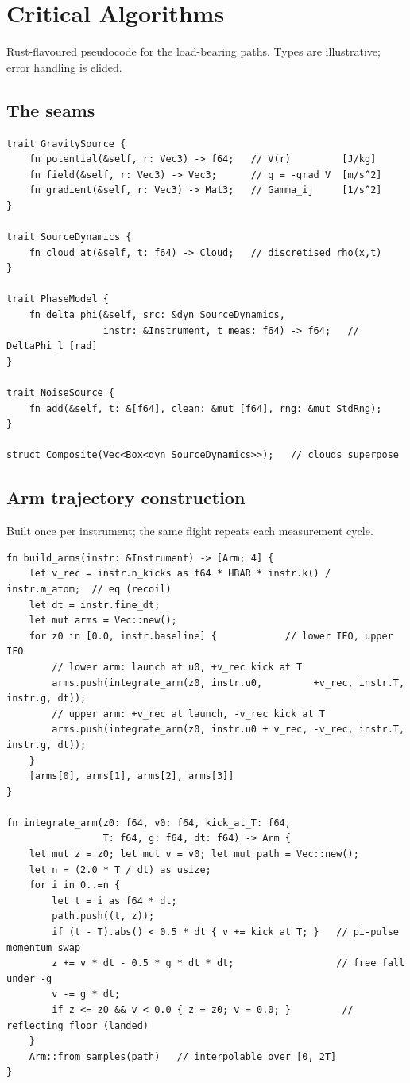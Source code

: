 \documentclass[11pt,a4paper]{article}
\theoremstyle{reqstyle}
\begin{document}
\section{Critical Algorithms}
\label{sec:algorithms}

Rust-flavoured pseudocode for the load-bearing paths. Types are illustrative; error
handling is elided.

\subsection{The seams}
\begin{lstlisting}
trait GravitySource {
    fn potential(&self, r: Vec3) -> f64;   // V(r)         [J/kg]
    fn field(&self, r: Vec3) -> Vec3;      // g = -grad V  [m/s^2]
    fn gradient(&self, r: Vec3) -> Mat3;   // Gamma_ij     [1/s^2]
}

trait SourceDynamics {
    fn cloud_at(&self, t: f64) -> Cloud;   // discretised rho(x,t)
}

trait PhaseModel {
    fn delta_phi(&self, src: &dyn SourceDynamics,
                 instr: &Instrument, t_meas: f64) -> f64;   // DeltaPhi_l [rad]
}

trait NoiseSource {
    fn add(&self, t: &[f64], clean: &mut [f64], rng: &mut StdRng);
}

struct Composite(Vec<Box<dyn SourceDynamics>>);   // clouds superpose
\end{lstlisting}

\subsection{Arm trajectory construction}
Built once per instrument; the same flight repeats each measurement cycle.
\begin{lstlisting}
fn build_arms(instr: &Instrument) -> [Arm; 4] {
    let v_rec = instr.n_kicks as f64 * HBAR * instr.k() / instr.m_atom;  // eq (recoil)
    let dt = instr.fine_dt;
    let mut arms = Vec::new();
    for z0 in [0.0, instr.baseline] {            // lower IFO, upper IFO
        // lower arm: launch at u0, +v_rec kick at T
        arms.push(integrate_arm(z0, instr.u0,         +v_rec, instr.T, instr.g, dt));
        // upper arm: +v_rec at launch, -v_rec kick at T
        arms.push(integrate_arm(z0, instr.u0 + v_rec, -v_rec, instr.T, instr.g, dt));
    }
    [arms[0], arms[1], arms[2], arms[3]]
}

fn integrate_arm(z0: f64, v0: f64, kick_at_T: f64,
                 T: f64, g: f64, dt: f64) -> Arm {
    let mut z = z0; let mut v = v0; let mut path = Vec::new();
    let n = (2.0 * T / dt) as usize;
    for i in 0..=n {
        let t = i as f64 * dt;
        path.push((t, z));
        if (t - T).abs() < 0.5 * dt { v += kick_at_T; }   // pi-pulse momentum swap
        z += v * dt - 0.5 * g * dt * dt;                  // free fall under -g
        v -= g * dt;
        if z <= z0 && v < 0.0 { z = z0; v = 0.0; }         // reflecting floor (landed)
    }
    Arm::from_samples(path)   // interpolable over [0, 2T]
}
\end{lstlisting}
\end{document}
